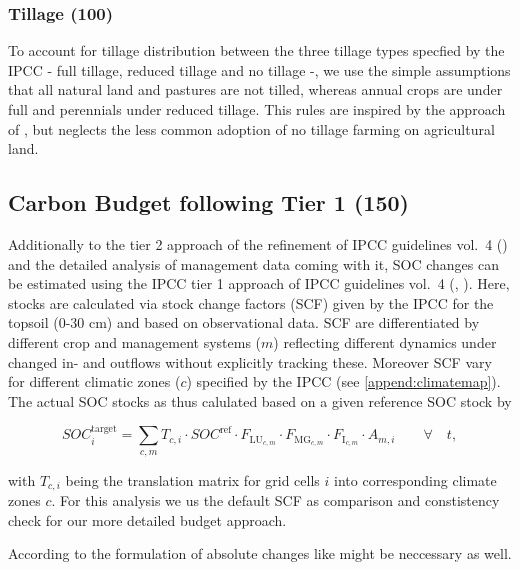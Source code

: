 \documentclass[gc, manuscript]{copernicus}
\begin{document}
\hypertarget{tillage-100}{%
\subsubsection{Tillage (100)}\label{tillage-100}}

To account for tillage distribution between the three tillage types specfied by the IPCC - full tillage, reduced tillage and no tillage -, we use the simple assumptions that all natural land and pastures are not tilled, whereas annual crops are under full and perennials under reduced tillage. This rules are inspired by the approach of \citep{porvolik}, but neglects the less common adoption of no tillage farming on agricultural land.

\newpage

\hypertarget{sec:tier1}{%
\subsection{Carbon Budget following Tier 1 (150)}\label{sec:tier1}}

Additionally to the tier 2 approach of the refinement of IPCC guidelines vol.~4 (\citet{ipcc_2019_2019}) and the detailed analysis of management data coming with it, SOC changes can be estimated using the IPCC tier 1 approach of IPCC guidelines vol.~4 (\citet{ipcc_2006_2006}, \citet{ipcc_2019_2019}). Here, stocks are calculated via stock change factors (SCF) given by the IPCC for the topsoil (0-30 cm) and based on observational data. SCF are differentiated by different crop and management systems (\(m\)) reflecting different dynamics under changed in- and outflows without explicitly tracking these. Moreover SCF vary for different climatic zones (\(c\)) specified by the IPCC (see \ref{append:climatemap}). The actual SOC stocks as thus calulated based on a given reference SOC stock by

\begin{equation}
SOC^{\text{target}}_{i} = \sum_{c,m} T_{c,i} \cdot SOC^{\text{ref}} \cdot F_{\text{LU}_{c,m}} \cdot F_{\text{MG}_{c,m}} \cdot F_{\text{I}_{c,m}} \cdot A_{m,i} \qquad\forall\quad t,
\label{eq:tier1}
\end{equation}

with \(T_{c,i}\) being the translation matrix for grid cells \(i\) into corresponding climate zones \(c\). For this analysis we us the default SCF as comparison and constistency check for our more detailed budget approach.

According to \citep{ipcc_2019_2019} the formulation of absolute changes like
might be neccessary as well.
\end{document}
